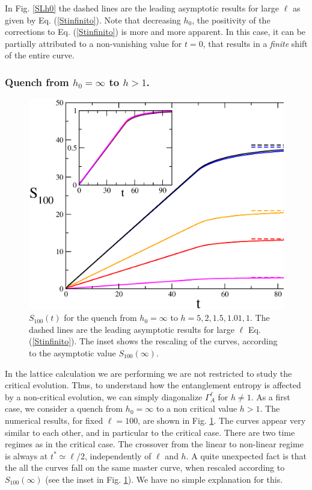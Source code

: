 \documentclass[12pt,preprint,tighten,eqsecnum,aps,floats,psfig,epsfig,amsmath,onecolumn]{revtex4-1}
\begin{document}
In Fig. \ref{SLh0} the dashed lines are the leading asymptotic results for 
large $\ell$ as given by Eq. (\ref{Stinfinito}).
Note that decreasing $h_0$, the positivity of the corrections to 
Eq. (\ref{Stinfinito}) is more and more apparent. 
In this case, it can be partially attributed to a non-vanishing value for 
$t=0$, that results in a {\em finite} shift of the entire curve.




\subsubsection{Quench from $h_0=\infty$ to $h>1$.}

\begin{figure}[t]
\centerline{\includegraphics[width=15cm]{SLh.eps}}
\caption{$S_{100}(t)$ for the quench from $h_0=\infty$ to $h=5,2,1.5,1.01,1$.
The dashed lines are the leading asymptotic results for large $\ell$ 
Eq. (\ref{Stinfinito}).
The inset shows the rescaling of the curves, according to the asymptotic 
value $S_{100}(\infty)$.}
\label{SLh}
\end{figure}

In the lattice calculation we are performing we are not restricted to
study the critical evolution. Thus, to understand how the entanglement 
entropy is affected by a non-critical evolution, we can simply diagonalize
$\Gamma_A^\ell$ for $h\neq1$.
As a first case, we consider a quench from $h_0=\infty$ to a 
non critical value $h>1$.
The numerical results, for fixed $\ell=100$, are shown in Fig. \ref{SLh}. 
The curves appear very similar to each other, and in particular to the 
critical case. There are two time regimes as in the critical case.
The crossover from the linear to non-linear regime is always at 
$t^*\simeq \ell/2$, independently of $\ell$ and $h$.  
A quite unexpected fact is that the all the curves fall 
on the same master curve, when rescaled according to $S_{100}(\infty)$
(see the inset in Fig. \ref{SLh}). 
We have no simple explanation for this.
\end{document}
